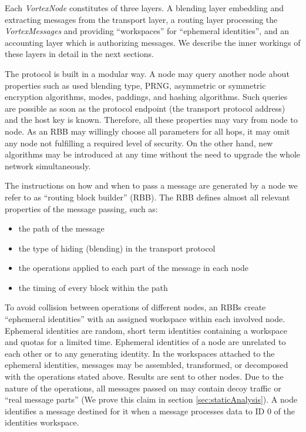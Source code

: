 \documentclass[acmsmall, screen, final, natbib=false]{acmart}
\begin{document}
	Each \emph{VortexNode} constitutes of three layers. A blending layer embedding and extracting messages from the transport layer, a routing layer processing the \emph{VortexMessages} and providing ``workspaces'' for ``ephemeral identities'', and an accounting layer which is authorizing messages. We describe the inner workings of these layers in detail in the next sections.
	
	The protocol is built in a modular way. A node may query another node about properties such as used blending type, PRNG, asymmetric or symmetric encryption algorithms, modes, paddings, and hashing algorithms. Such queries are possible as soon as the protocol endpoint (the transport protocol address) and the host key is known. Therefore, all these properties may vary from node to node. As an RBB may willingly choose all parameters for all hops, it may omit any node not fulfilling a required level of security. On the other hand, new algorithms may be introduced at any time without the need to upgrade the whole network simultaneously. 
	
	The instructions on how and when to pass a message are generated by a node we refer to as ``routing block builder'' (RBB). The RBB defines almost all relevant properties of the message passing, such as: 
	\begin{itemize}
		\item the path of the message
		\item the type of hiding (blending) in the transport protocol
		\item the operations applied to each part of the message in each node
		\item the timing of every block within the path
	\end{itemize}
	
	To avoid collision between operations of different nodes, an RBBs create ``ephemeral identities'' with an assigned workspace within each involved node. Ephemeral identities are random, short term identities containing a workspace and quotas for a limited time. Ephemeral identities of a node are unrelated to each other or to any generating identity. In the workspaces attached to the ephemeral identities, messages may be assembled, transformed, or decomposed with the operations stated above. Results are sent to other nodes. Due to the nature of the operations, all messages passed on may contain decoy traffic or ``real message parts'' (We prove this claim in section \ref{sec:staticAnalysis}). A node identifies a message destined for it when a message processes data to ID 0 of the identities workspace.
	
\end{document}
